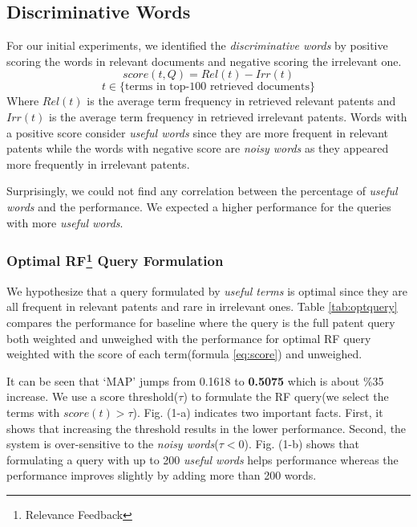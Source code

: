 \documentclass{sig-alternate}
\begin{document}
\subsection{Discriminative Words}
For our initial experiments, we identified the {\em discriminative words} by positive scoring the words in relevant documents and negative scoring the irrelevant one. 
\begin{equation}
score(t,Q)=Rel(t)-Irr(t) 
 \label{eq:score}
\end{equation}
\begin{displaymath}t\in \lbrace \mbox{terms in top-100 retrieved documents}\rbrace\end{displaymath}
Where $ Rel(t) $ is the average term frequency in retrieved relevant patents and $ Irr(t) $ is the average term frequency in retrieved irrelevant patents. Words with a positive score consider {\em useful words} since they are more frequent in relevant patents while the words with negative score are {\em noisy words} as they appeared more frequently in irrelevant patents. 

Surprisingly, we could not find any correlation between the percentage of {\em useful words} and the performance. We expected a higher performance for the queries with more {\em useful words}. 

\subsubsection{Optimal RF\protect\footnote{Relevance Feedback} Query Formulation}
We hypothesize that a query formulated by {\em useful terms} is optimal since they are all frequent in relevant patents and rare in irrelevant ones. Table \ref{tab:optquery} compares the performance for baseline where the query is the full patent query both weighted and unweighed with the performance for optimal RF query weighted with the score of each term(formula \ref{eq:score}) and unweighed. 

\begin{table}[htpb]
  \begin{center}
   \caption{.}
     
  \label{tab:optquery}
  \end{center}  
\end{table}

It can be seen that `MAP' jumps from 0.1618 to \textbf{0.5075} which is about \%35 increase. We use a score threshold($\tau$) to formulate the RF query(we select the terms with $ score(t)>\tau $). Fig. (1-a) indicates two important facts. First, it shows that increasing the threshold results in the lower performance. Second, the system is over-sensitive to the {\em noisy words}($ \tau<0 $).  Fig. (1-b) shows that formulating a query with up to 200 {\em useful words} helps performance whereas the performance improves slightly by adding more than 200 words. 
\end{document}
